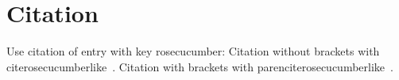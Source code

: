 \section{Citation}\label{sec:citation}

Use citation of entry with key rose\textunderscore cucumber: \newline
Citation without brackets with cite\textbraceleft rose\textunderscore cucumber\textbraceright\space like~\cite{rose_cucumber_2015}. \newline
Citation with brackets with parencite\textbraceleft rose\textunderscore cucumber\textbraceright\space like~\parencite{rose_cucumber_2015}.
